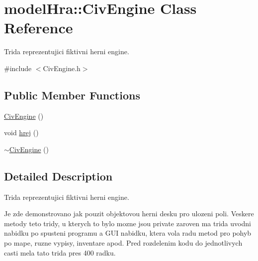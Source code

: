 \hypertarget{classmodel_hra_1_1_civ_engine}{\section{model\-Hra\-:\-:Civ\-Engine Class Reference}
\label{classmodel_hra_1_1_civ_engine}
}


Trida reprezentujici fiktivni herni engine.  




{\ttfamily \#include $<$Civ\-Engine.\-h$>$}

\subsection*{Public Member Functions}
\begin{DoxyCompactItemize}
\item 
\hyperlink{classmodel_hra_1_1_civ_engine_aa5b0289a0498cd791c30d5683d3e953b}{Civ\-Engine} ()
\item 
void \hyperlink{classmodel_hra_1_1_civ_engine_aa3b81148998d9fb5071564cc635a2e78}{hrej} ()
\item 
\hyperlink{classmodel_hra_1_1_civ_engine_a520e09ffd2bafb98aa2eef1bd695e710}{$\sim$\-Civ\-Engine} ()
\end{DoxyCompactItemize}


\subsection{Detailed Description}
Trida reprezentujici fiktivni herni engine. 

Je zde demonstrovano jak pouzit objektovou herni desku pro ulozeni poli. Veskere metody teto tridy, u kterych to bylo mozne jsou private zaroven ma trida uvodni nabidku po spusteni programu a G\-U\-I nabidku, ktera vola radu metod pro pohyb po mape, ruzne vypisy, inventare apod. Pred rozdelenim kodu do jednotlivych casti mela tato trida pres 400 radku. 

